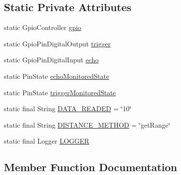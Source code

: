 \subsection*{Static Private Attributes}
\begin{DoxyCompactItemize}
\item 
static Gpio\+Controller \hyperlink{classcom_1_1libsensorj_1_1concretesensor_1_1test_1_1UltrasonicHcsr04Tests_adf38a509f718d2c0f6d5b3b46e80b14f}{gpio}
\item 
static Gpio\+Pin\+Digital\+Output \hyperlink{classcom_1_1libsensorj_1_1concretesensor_1_1test_1_1UltrasonicHcsr04Tests_a55b09e3407d26ec3c58fa21959f48c37}{trigger}
\item 
static Gpio\+Pin\+Digital\+Input \hyperlink{classcom_1_1libsensorj_1_1concretesensor_1_1test_1_1UltrasonicHcsr04Tests_a49612a704da180e2bf179ad4cee90f0b}{echo}
\item 
static Pin\+State \hyperlink{classcom_1_1libsensorj_1_1concretesensor_1_1test_1_1UltrasonicHcsr04Tests_ac0a797e07398495efe276cbeb1a38129}{echo\+Monitored\+State}
\item 
static Pin\+State \hyperlink{classcom_1_1libsensorj_1_1concretesensor_1_1test_1_1UltrasonicHcsr04Tests_a51543cdaf2606945a604c3f67aeac74c}{trigger\+Monitored\+State}
\item 
static final String \hyperlink{classcom_1_1libsensorj_1_1concretesensor_1_1test_1_1UltrasonicHcsr04Tests_ad3de6228bd8a3aebd4513449d1955307}{D\+A\+T\+A\+\_\+\+R\+E\+A\+D\+E\+D} = \char`\"{}10\char`\"{}
\item 
static final String \hyperlink{classcom_1_1libsensorj_1_1concretesensor_1_1test_1_1UltrasonicHcsr04Tests_aa58fea25250a46443932bb015e0af28f}{D\+I\+S\+T\+A\+N\+C\+E\+\_\+\+M\+E\+T\+H\+O\+D} = \char`\"{}get\+Range\char`\"{}
\item 
static final Logger \hyperlink{classcom_1_1libsensorj_1_1concretesensor_1_1test_1_1UltrasonicHcsr04Tests_a2ecfecf256b928e26574e87880593489}{L\+O\+G\+G\+E\+R}
\end{DoxyCompactItemize}


\subsection{Member Function Documentation}
\hypertarget{classcom_1_1libsensorj_1_1concretesensor_1_1test_1_1UltrasonicHcsr04Tests_afbf1cd39d83e2df5d01b4cbe546269f6}{}
